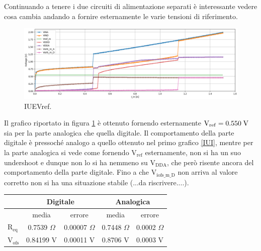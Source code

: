 Continuando a tenere i due circuiti di alimentazione separati è interessante vedere cosa cambia andando a fornire esternamente le varie tensioni di riferimento. 
\begin{figure}
\centering
\includegraphics[scale=.3]{Immagini/IUEVref2}
\caption{IUEVref.}
\label{IUEVref}
\end{figure}
Il grafico riportato in figura \ref{IUEVref} è ottenuto fornendo esternamente  $\mathrm{V_{ref}}=0.550 \rm \; V$  sia per la parte analogica che quella digitale. Il comportamento della parte digitale è pressoché analogo a quello ottenuto nel primo grafico \ref{IUI}, mentre per la parte analogica si vede come fornendo $\mathrm{V_{ref}}$ esternamente, non si ha un suo undershoot e dunque non lo si ha nemmeno su $\mathrm{V_{DDA}}$, che però risente ancora del comportamento della parte digitale. Fino a che $\mathrm{V_{iofs\_ m \_ D}}$ non arriva al valore corretto non si ha una situazione stabile (...da riscrivere....).

\begin{center}
\begin{tabular}{|l|c|c|c|c|}
\hline
 & \multicolumn{2}{c|}{Digitale} & \multicolumn{2}{c|}{Analogica} \\ \hline
 
& media & errore & media & errore \\ \hline

$\mathrm{R_{eq}}$ & 0.7539 $\Omega$ & 0.00007 $\Omega$& 0.7448 $\Omega$ & 0.0002 $\Omega$ \\ \hline
$\mathrm{V_{ofs}}$ & 0.84199 V& 0.00011 V & 0.8706 V & 0.0003 V\\ \hline     

\end{tabular}
\end{center}


